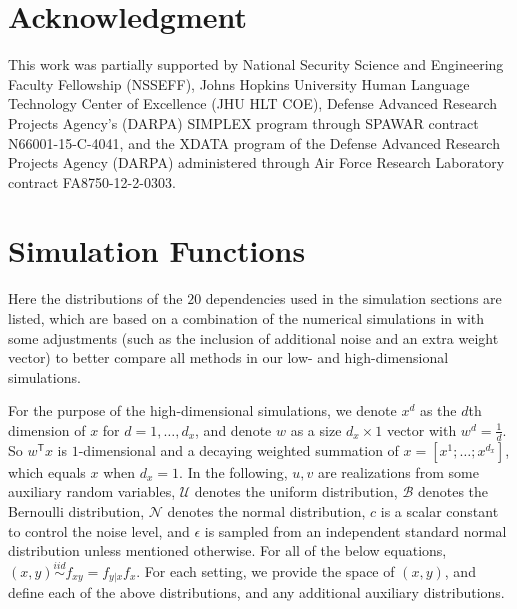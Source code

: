 \documentclass[11pt]{article}
\providecommand{\mc}[1]{\mathcal{#1}}
\newcommand{\T}{^{\ensuremath{\mathsf{T}}}}           %
\begin{document}



\section*{Acknowledgment}
This work was partially supported by 
% 
National Security Science and Engineering Faculty Fellowship (NSSEFF), 
% 
Johns Hopkins University Human Language Technology Center of Excellence (JHU HLT COE), 
% 
Defense Advanced Research Projects Agency's (DARPA) SIMPLEX program through SPAWAR contract N66001-15-C-4041, 
% 
and the XDATA program of the Defense Advanced Research Projects Agency (DARPA) administered through Air Force Research Laboratory contract FA8750-12-2-0303.



\appendix
\setcounter{figure}{0}
\renewcommand\thefigure{A\arabic{figure}} 

\section{Simulation Functions}
\label{appen:function}

Here the distributions of the $20$ dependencies used in the simulation sections are listed, which are based on a combination of the numerical simulations in \cite{SzekelyRizzoBakirov2007, SimonTibshirani2012, SimonTibshirani2012, GorfineHellerHeller2012} with some adjustments (such as the inclusion of additional noise and an extra weight vector) to better compare all methods in our low- and high-dimensional simulations.

For the purpose of the high-dimensional simulations, we denote $x^{d}$ as the $d$th dimension of $x$ for $d=1,\ldots,d_{x}$, and denote $w$ as a size $d_{x} \times 1$ vector with $w^{d}=\frac{1}{d}$. So $w\T x$ is $1$-dimensional and a decaying weighted summation of $x=[x^{1};\ldots;x^{d_{x}}]$, which equals $x$ when $d_{x}=1$. In the following, $u, v$ are realizations from some auxiliary random variables, $\mc{U}$ denotes the uniform distribution, $\mc{B}$ denotes the Bernoulli distribution, $\mc{N}$ denotes the normal distribution, $c$ is a scalar constant to control the noise level, and $\epsilon$ is sampled from an independent standard normal distribution unless mentioned otherwise. For all of the below equations, $(x,y) \overset{iid}{\sim} f_{xy} = f_{y|x} f_x$. For each setting, we provide the space of $(x,y)$, and define each of the above distributions, and any additional auxiliary distributions.
\end{document}
